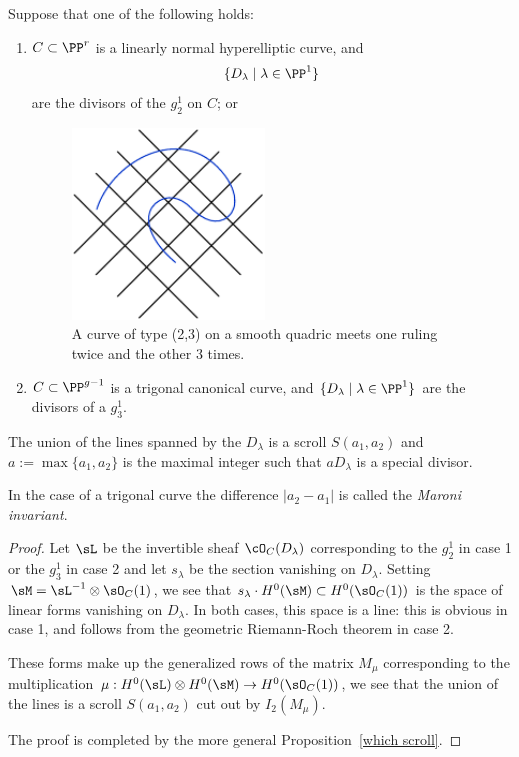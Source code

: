 \begin{corollary}\label{hyperelliptic and trigonal} Suppose that one of the following holds:
\begin{enumerate}
 \item  $C\subset \PP^r$ is a linearly normal hyperelliptic curve, and  
$$
\{D_\lambda \mid \lambda \in \PP^1\}
$$
are the divisors of the $g^1_2$ on $C$; or


\begin{figure}
\centerline {\includegraphics[height=2in]{"main/Fig16-2"}}
\caption{A curve of type (2,3) on a smooth quadric meets one ruling twice and the other 3 times.}
\label{2,3 on quadric}
\end{figure}

\item $C\subset \PP^{g-1}$ is a trigonal canonical curve, and  
$\{D_\lambda \mid \lambda \in \PP^1\}$
are the divisors of a $g^1_3$.
\end{enumerate}

The union of the lines spanned by the $D_\lambda$
is a scroll $S(a_1,a_2)$ and $a:= \max\{a_1, a_2\}$ is the maximal integer such that
$aD_\lambda$ is a special divisor.
\end{corollary}

\begin{remark}
 In the case of a trigonal curve the difference $|a_2-a_1|$ is called the \emph{Maroni invariant}.
\end{remark}
\begin{proof}
Let $\sL$ be the invertible sheaf $\cO_C(D_\lambda)$ corresponding to the $g^1_2$ in case 1 or
the $g_3^1$ in case 2 and let $s_\lambda$ be
the section vanishing on $D_\lambda$. Setting $\sM =  \sL^{-1}\otimes \sO_C(1)$, we see that
$s_\lambda\cdot H^0(\sM) \subset H^0(\sO_C(1))$ is the space of linear forms vanishing on
$D_\lambda$. In both cases, this space is a line: this is obvious in case 1, and follows from the 
geometric Riemann-Roch theorem in case 2. 

These forms make up the
generalized rows of the matrix $M_\mu$ corresponding to the multiplication
$\mu: H^0(\sL)\otimes H^0(\sM) \to H^0(\sO_C(	1))$, we see that the union of the lines is a
scroll $S(a_1,a_2)$ cut out by $I_2(M_\mu)$.

The proof is completed by the more general Proposition~\ref{which scroll}.
\end{proof}

